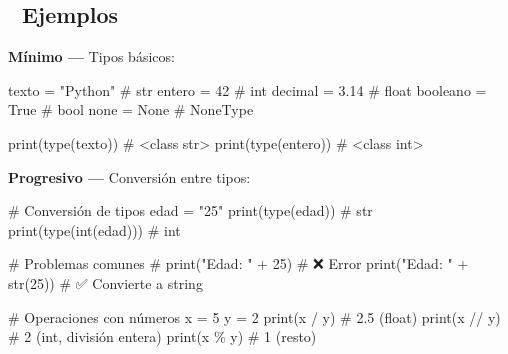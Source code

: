 \documentclass[
  doc,
  floatsintext,
  longtable,
  a4paper,
  nolmodern,
  notxfonts,
  notimes,
  12pt,
  colorlinks=true,linkcolor=blue,citecolor=blue,urlcolor=blue]{apa7}
\newenvironment{Shaded}{\begin{snugshade}}{\end{snugshade}}
\newcommand{\BuiltInTok}[1]{\textcolor[rgb]{0.00,0.23,0.31}{#1}}
\newcommand{\CommentTok}[1]{\textcolor[rgb]{0.37,0.37,0.37}{#1}}
\newcommand{\DecValTok}[1]{\textcolor[rgb]{0.68,0.00,0.00}{#1}}
\newcommand{\FloatTok}[1]{\textcolor[rgb]{0.68,0.00,0.00}{#1}}
\newcommand{\NormalTok}[1]{\textcolor[rgb]{0.00,0.23,0.31}{#1}}
\newcommand{\OperatorTok}[1]{\textcolor[rgb]{0.37,0.37,0.37}{#1}}
\newcommand{\StringTok}[1]{\textcolor[rgb]{0.13,0.47,0.30}{#1}}
\newcommand{\VariableTok}[1]{\textcolor[rgb]{0.07,0.07,0.07}{#1}}
\newcounter{none} %
\begin{document}
\subsection{🔬 Ejemplos}\label{ejemplos}

\textbf{Mínimo ---} Tipos básicos:

\begin{Shaded}
\begin{Highlighting}[]
\NormalTok{texto }\OperatorTok{=} \StringTok{"Python"}          \CommentTok{\# str}
\NormalTok{entero }\OperatorTok{=} \DecValTok{42}              \CommentTok{\# int}
\NormalTok{decimal }\OperatorTok{=} \FloatTok{3.14}           \CommentTok{\# float}
\NormalTok{booleano }\OperatorTok{=} \VariableTok{True}          \CommentTok{\# bool}
\NormalTok{none }\OperatorTok{=} \VariableTok{None}              \CommentTok{\# NoneType}

\BuiltInTok{print}\NormalTok{(}\BuiltInTok{type}\NormalTok{(texto))    }\CommentTok{\# \textless{}class \textquotesingle{}str\textquotesingle{}\textgreater{}}
\BuiltInTok{print}\NormalTok{(}\BuiltInTok{type}\NormalTok{(entero))   }\CommentTok{\# \textless{}class \textquotesingle{}int\textquotesingle{}\textgreater{}}
\end{Highlighting}
\end{Shaded}

\textbf{Progresivo ---} Conversión entre tipos:

\begin{Shaded}
\begin{Highlighting}[]
\CommentTok{\# Conversión de tipos}
\NormalTok{edad }\OperatorTok{=} \StringTok{"25"}
\BuiltInTok{print}\NormalTok{(}\BuiltInTok{type}\NormalTok{(edad))      }\CommentTok{\# str}
\BuiltInTok{print}\NormalTok{(}\BuiltInTok{type}\NormalTok{(}\BuiltInTok{int}\NormalTok{(edad))) }\CommentTok{\# int}

\CommentTok{\# Problemas comunes}
\CommentTok{\# print("Edad: " + 25)  \# ❌ Error}
\BuiltInTok{print}\NormalTok{(}\StringTok{"Edad: "} \OperatorTok{+} \BuiltInTok{str}\NormalTok{(}\DecValTok{25}\NormalTok{))  }\CommentTok{\# ✅ Convierte a string}

\CommentTok{\# Operaciones con números}
\NormalTok{x }\OperatorTok{=} \DecValTok{5}
\NormalTok{y }\OperatorTok{=} \DecValTok{2}
\BuiltInTok{print}\NormalTok{(x }\OperatorTok{/}\NormalTok{ y)   }\CommentTok{\# 2.5 (float)}
\BuiltInTok{print}\NormalTok{(x }\OperatorTok{//}\NormalTok{ y)  }\CommentTok{\# 2 (int, división entera)}
\BuiltInTok{print}\NormalTok{(x }\OperatorTok{\%}\NormalTok{ y)   }\CommentTok{\# 1 (resto)}
\end{Highlighting}
\end{Shaded}
\end{document}
